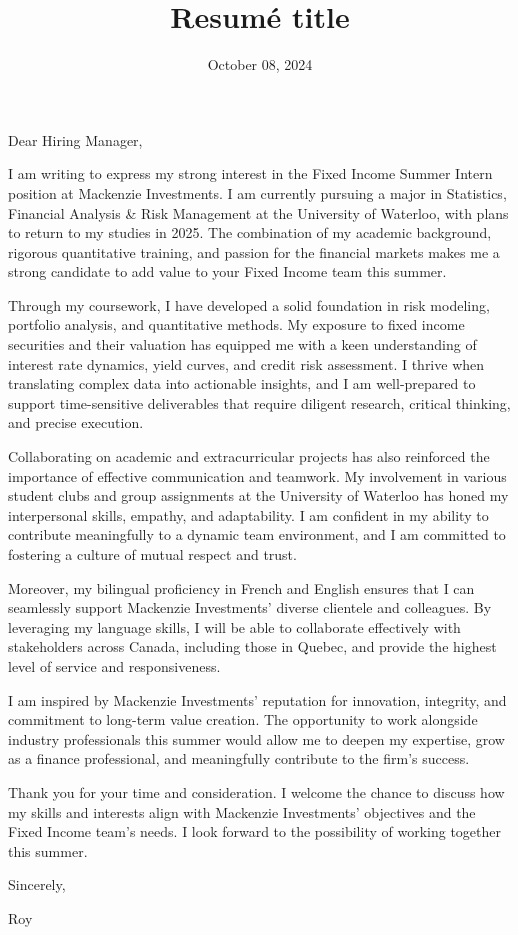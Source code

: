 \documentclass[11pt,a4paper,roman]{moderncv}        %
\title{Resumé title}                               %
\date{October 08, 2024}                              %
\begin{document}
\recipient{\phantom{1}}{}
\opening{\phantom{1}}
\closing{\phantom{1}}
\enclosure[\phantom{1}]{\phantom{1}}          %
\makelettertitle

Dear Hiring Manager,

I am writing to express my strong interest in the Fixed Income Summer Intern position at Mackenzie Investments. I am currently pursuing a major in Statistics, Financial Analysis \& Risk Management at the University of Waterloo, with plans to return to my studies in 2025. The combination of my academic background, rigorous quantitative training, and passion for the financial markets makes me a strong candidate to add value to your Fixed Income team this summer.

Through my coursework, I have developed a solid foundation in risk modeling, portfolio analysis, and quantitative methods. My exposure to fixed income securities and their valuation has equipped me with a keen understanding of interest rate dynamics, yield curves, and credit risk assessment. I thrive when translating complex data into actionable insights, and I am well-prepared to support time-sensitive deliverables that require diligent research, critical thinking, and precise execution.

Collaborating on academic and extracurricular projects has also reinforced the importance of effective communication and teamwork. My involvement in various student clubs and group assignments at the University of Waterloo has honed my interpersonal skills, empathy, and adaptability. I am confident in my ability to contribute meaningfully to a dynamic team environment, and I am committed to fostering a culture of mutual respect and trust.

Moreover, my bilingual proficiency in French and English ensures that I can seamlessly support Mackenzie Investments’ diverse clientele and colleagues. By leveraging my language skills, I will be able to collaborate effectively with stakeholders across Canada, including those in Quebec, and provide the highest level of service and responsiveness.

I am inspired by Mackenzie Investments’ reputation for innovation, integrity, and commitment to long-term value creation. The opportunity to work alongside industry professionals this summer would allow me to deepen my expertise, grow as a finance professional, and meaningfully contribute to the firm’s success.

Thank you for your time and consideration. I welcome the chance to discuss how my skills and interests align with Mackenzie Investments’ objectives and the Fixed Income team’s needs. I look forward to the possibility of working together this summer.

Sincerely,

Roy

\vspace{0.5cm}
\end{document}
